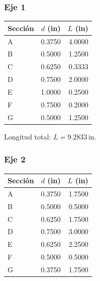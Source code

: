 \documentclass[11pt,a4paper]{article}
\newcommand{\inch}{\,\mathrm{in}}
\begin{document}
\subsubsection*{Eje 1}

\begin{center}\small\begin{tabular}{lrr}\toprule

Sección & $d$ (in) & $L$ (in) \\ \midrule

A & 0.3750 & 4.0000 \\

B & 0.5000 & 1.2500 \\

C & 0.6250 & 0.3333 \\

D & 0.7500 & 2.0000 \\

E & 1.0000 & 0.2500 \\

F & 0.7500 & 0.2000 \\

G & 0.5000 & 1.2500 \\

\bottomrule\end{tabular}\end{center}

Longitud total: $L=9.2833\inch$.

\subsubsection*{Eje 2}

\begin{center}\small\begin{tabular}{lrr}\toprule

Sección & $d$ (in) & $L$ (in) \\ \midrule

A & 0.3750 & 1.7500 \\

B & 0.5000 & 0.5000 \\

C & 0.6250 & 1.7500 \\

D & 0.7500 & 3.0000 \\

E & 0.6250 & 2.2500 \\

F & 0.5000 & 0.5000 \\

G & 0.3750 & 1.7500 \\

\bottomrule\end{tabular}\end{center}
\end{document}

